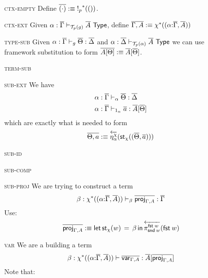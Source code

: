 \documentclass[10pt]{article}
\theoremstyle{definition}
\newcommand\dsd[1]{\ensuremath{\mathsf{#1}}}
\newcommand{\yields}{\vdash}
\newcommand{\TYPE}{\,\,\mathsf{Type}}
\newcommand{\app}[2]{\ensuremath{#1 \: #2}}
\newcommand{\telety}[3]{\ensuremath{(#1{:}#2,#3)}}
\newcommand{\mt}[0]{\ensuremath{()}}
\newcommand{\fst}[1]{\app{\dsd{fst}}{#1}}
\newcommand{\snd}[1]{\app{\dsd{snd}}{#1}}
\newcommand{\rewrite}[2]{\overleftarrow{#1}(#2)}
\newcommand\St[2]{\ensuremath{{#1}^*(#2)}}
\newcommand\StI[2]{\ensuremath{\mathsf{st}_{#1}(#2)}}
\newcommand\StE[4]{\ensuremath{\mathsf{let} \, \StI{#1}{#3} \, = \, {#2} \, \mathsf{in} \, #4}}
\newcommand\El[2]{\mathcal{T}_{#1}(#2)}
\begin{document}
\begin{enumerate}
\item[\textsc{ctx-empty}] Define $\upstairs{(\cdot)} :\equiv \St{!_p}{\mt}$.
\item[\textsc{ctx-ext}] Given $\alpha : \upstairs{\Gamma} \yields_{\El{p}{g}} \upstairs{A} \TYPE$, define $\upstairs{\Gamma, A} :\equiv \St{\chi}{\telety{\alpha}{\upstairs{\Gamma}}{\upstairs{A}}}$
\item[\textsc{type-sub}] Given $\alpha : \upstairs{\Gamma} \yields_g \upstairs{\Theta} : \upstairs{\Delta}$ and $\alpha : \upstairs{\Delta} \yields_{\El{p}{\alpha}} \upstairs{A} \TYPE$ we can use framework substitution to form $\overline{A[\Theta]} :\equiv \overline{A}[\overline{\Theta}]$.
\item[\textsc{term-sub}] 
\item[\textsc{sub-ext}] We have
\begin{align*}
\alpha : \upstairs{\Gamma} &\yields_\alpha \upstairs{\Theta} : \upstairs{\Delta} \\
\alpha : \upstairs{\Gamma} &\yields_{1_\alpha} \upstairs{a} : \upstairs{A}[\upstairs{\Theta}]
\end{align*}
which are exactly what is needed to form
\begin{align*}
\upstairs{\Theta, a} :\equiv \rewrite{\eta^\chi_{\alpha}}{\StI{\chi}{(\upstairs{\Theta}, \upstairs{a})}}
\end{align*}
\item[\textsc{sub-id}] 
\item[\textsc{sub-comp}] 
\item[\textsc{sub-proj}] We are trying to construct a term
\begin{align*}
\beta : \St{\chi}{\telety{\alpha}{\upstairs{\Gamma}}{\upstairs{A}}} \yields_\beta \upstairs{\proj{\Gamma, A}} : \upstairs{\Gamma}
\end{align*}
Use:
\begin{align*}
\upstairs{\proj{\Gamma, A}} :\equiv \StE{\chi}{\beta}{w}{\rewrite{\pi^{\fst w}_{\snd w}}{\fst w}}
\end{align*}
\item[\textsc{var}] We are a building a term
\begin{align*}
\beta : \St{\chi}{\telety{\alpha}{\upstairs{\Gamma}}{\upstairs{A}}} \yields \upstairs{\var{\Gamma, A}} : \upstairs{A}[\upstairs{\proj{\Gamma, A}}]
\end{align*}
Note that:
\begin{align*}

\end{align*}
\end{enumerate}
\end{document}
